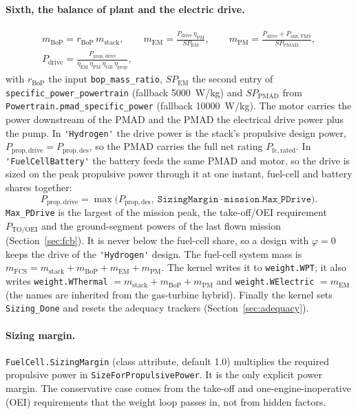 \documentclass[a4paper,11pt]{article}
\newcommand{\code}[1]{\nolinkurl{#1}}
\newcommand{\fn}[1]{\nolinkurl{#1}}
\begin{document}
\paragraph{Sixth, the balance of plant and the electric drive.}
\begin{gather}
  m_\mathrm{BoP} = r_\mathrm{BoP}\, m_\mathrm{stack}, \qquad
  m_\mathrm{EM} = \frac{P_\mathrm{drive}\,\eta_\mathrm{PM}}{SP_\mathrm{EM}}, \qquad
  m_\mathrm{PM} = \frac{P_\mathrm{drive}+P_\mathrm{aux,TMS}}{SP_\mathrm{PMAD}}, \nonumber\\
  P_\mathrm{drive} = \frac{P_\mathrm{prop,drive}}{\eta_\mathrm{EM}\,\eta_\mathrm{PM}\,\eta_\mathrm{GB}\,\eta_\mathrm{prop}},
  \label{eq:drive}
\end{gather}
with $r_\mathrm{BoP}$ the input \code{bop_mass_ratio}, $SP_\mathrm{EM}$ the second entry of
\code{specific_power_powertrain} (fallback \SI{5000}{W/kg}) and $SP_\mathrm{PMAD}$ from
\fn{Powertrain.pmad_specific_power} (fallback \SI{10000}{W/kg}). The motor carries the power
downstream of the PMAD and the PMAD the electrical drive power plus the pump. In
\code{'Hydrogen'} the drive power is the stack's propulsive design power,
$P_\mathrm{prop,drive}=P_\mathrm{prop,des}$, so the PMAD carries the full net rating
$P_\mathrm{fc,rated}$. In \code{'FuelCellBattery'} the battery feeds the same PMAD and motor,
so the drive is sized on the peak propulsive power through it at one instant, fuel-cell and
battery shares together:
\begin{equation}
  P_\mathrm{prop,drive} = \max\big(P_\mathrm{prop,des},\ \mathtt{SizingMargin}\cdot\mathtt{mission.Max\_PDrive}\big).
\end{equation}
\code{Max_PDrive} is the largest of the mission peak, the take-off/OEI requirement
$P_\mathrm{TO/OEI}$ and the ground-segment powers of the last flown mission
(Section~\ref{sec:fcb}). It is never below the fuel-cell share, so a design with $\varphi=0$
keeps the drive of the \code{'Hydrogen'} design. The fuel-cell system mass is
$m_\mathrm{FCS}=m_\mathrm{stack}+m_\mathrm{BoP}+m_\mathrm{EM}+m_\mathrm{PM}$. The kernel
writes it to \code{weight.WPT}; it also writes \code{weight.WThermal} $=m_\mathrm{stack}+m_\mathrm{BoP}+m_\mathrm{PM}$
and \code{weight.WElectric} $=m_\mathrm{EM}$ (the names are inherited from the gas-turbine
hybrid). Finally the kernel sets \code{Sizing_Done} and resets the adequacy trackers
(Section~\ref{sec:adequacy}).

\paragraph{Sizing margin.} \code{FuelCell.SizingMargin} (class attribute, default 1.0)
multiplies the required propulsive power in \fn{SizeForPropulsivePower}. It is the only
explicit power margin. The conservative case comes from the take-off and one-engine-inoperative
(OEI) requirements that the weight loop passes in, not from hidden factors.
\end{document}
